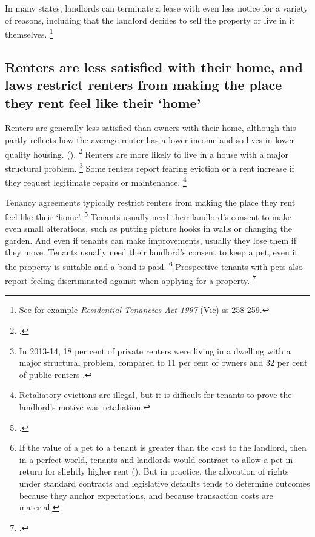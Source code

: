 In many states, landlords can terminate a lease with even less notice for a variety of reasons, including that the landlord decides to sell the property or live in it themselves.%
	\footnote{See for example \emph{Residential Tenancies Act 1997} (Vic) ss 258-259.}

\subsection{Renters are less satisfied with their home, and laws restrict renters from making the place they rent feel like their `home'}\label{subsec:renters-are-less-satisfied-with-their-home-and-laws-restrict-renters-from-making-the-place-they-rent-feel-like-their-home}

Renters are generally less satisfied than owners with their home, although this partly reflects how the average renter has a lower income and so lives in lower quality housing. ().%
	\footcite{ABS-201314-occupancy-and-costs}
Renters are more likely to live in a house with a major structural problem.%
	\footnote{In 2013-14, 18 per cent of private renters were living in a dwelling with a major structural problem, compared to 11 per cent of owners and 32 per cent of public renters \textcite{ABS-201314-occupancy-and-costs}.}
Some renters report fearing eviction or a rent increase if they request legitimate repairs or maintenance.%
	\footnote{Retaliatory evictions are illegal, but it is difficult for tenants to prove the landlord's motive was retaliation.}

Tenancy agreements typically restrict renters from making the place they rent feel like their `home'.%
	\footcite{KellyHarrisonHunterEtAl2013}
Tenants usually need their landlord's consent to make even small alterations, such as putting picture hooks in walls or changing the garden.
And even if tenants can make improvements, usually they lose them if they move.
Tenants usually need their landlord's consent to keep a pet, even if the property is suitable and a bond is paid.%
    \footnote{If the value of a pet to a tenant is greater than the cost to the landlord, then in a perfect world, tenants and landlords would contract to allow a pet in return for slightly higher rent (\textcite{Coase_1960_social_cost}).
    But in practice, the allocation of rights under standard contracts and legislative defaults tends to determine outcomes because they anchor expectations, and because transaction costs are material.}
Prospective tenants with pets also report feeling discriminated against when applying for a property.%
	\footcites{Natl-Shelter-2017-Life-in-Aust-private-rental-market}{Sparvell-2016-Vic-renters-may-soon-have-pets}

